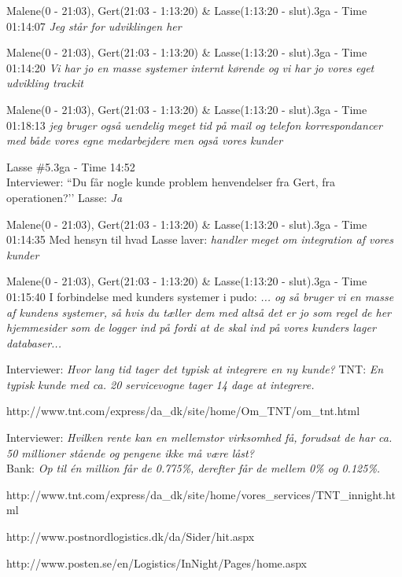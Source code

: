 \begin{thebibliography}{9}
	Malene(0 - 21:03), Gert(21:03 - 1:13:20) \& Lasse(1:13:20 - slut).3ga - Time 01:14:07
	\textit{Jeg står for udviklingen her}
 
	Malene(0 - 21:03), Gert(21:03 - 1:13:20) \& Lasse(1:13:20 - slut).3ga - Time 01:14:20
	\textit{Vi har jo en masse systemer internt kørende og vi har jo vores eget udvikling trackit}

	Malene(0 - 21:03), Gert(21:03 - 1:13:20) \& Lasse(1:13:20 - slut).3ga - Time 01:18:13
	\textit{jeg bruger også uendelig meget tid på mail og telefon korrespondancer med både vores egne medarbejdere men også vores kunder}

	Lasse \#5.3ga - Time 14:52 \\
	Interviewer: ``Du får nogle kunde problem henvendelser fra Gert, fra operationen?’’
Lasse: \textit{Ja}

	Malene(0 - 21:03), Gert(21:03 - 1:13:20) \& Lasse(1:13:20 - slut).3ga - Time 01:14:35
	Med hensyn til hvad Lasse laver: \textit{handler meget om integration af vores kunder}

	Malene(0 - 21:03), Gert(21:03 - 1:13:20) \& Lasse(1:13:20 - slut).3ga - Time 01:15:40
	I forbindelse med kunders systemer i pudo: \textit{... og så bruger vi en masse af kundens systemer, så hvis du tæller dem med altså det er jo som regel de her hjemmesider som de logger ind på fordi at de skal ind på vores kunders lager databaser...}


	Interviewer: \textit{Hvor lang tid tager det typisk at integrere en ny kunde?}
	TNT: \textit{En typisk kunde med ca. 20 servicevogne tager 14 dage at integrere.}

	http://www.tnt.com/express/da\_dk/site/home/Om\_TNT/om\_tnt.html

	Interviewer: \textit{Hvilken rente kan en mellemstor virksomhed få, forudsat de har ca. 50 millioner stående og pengene ikke må være låst?}\\
	Bank: \textit{Op til én million får de 0.775\%, derefter får de mellem 0\% og 0.125\%.}

	http://www.tnt.com/express/da\_dk/site/home/vores\_services/TNT\_innight.html

	http://www.postnordlogistics.dk/da/Sider/hit.aspx

	http://www.posten.se/en/Logistics/InNight/Pages/home.aspx


\end{thebibliography}
